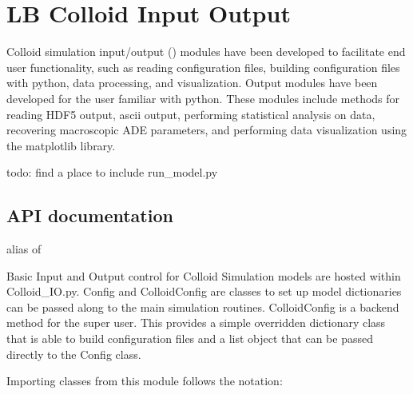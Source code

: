 \documentclass[letterpaper,10pt,english]{sphinxmanual}
\begin{document}
\section{LB Colloid Input Output}
\label{\detokenize{index:lb-colloid-input-output}}
Colloid simulation input/output () modules have been developed to facilitate end user functionality, such as reading configuration files, building configuration files with python, data processing, and visualization. Output modules have been developed for the user familiar with python. These modules include methods for reading HDF5 output, ascii output, performing statistical analysis on data, recovering macroscopic ADE parameters, and performing data visualization using the matplotlib library.

{\color{red}\bfseries{}\textbar{}}todo: find a place to include run\_model.py


\subsection{API documentation}
\label{\detokenize{index:id13}}\label{\detokenize{index:module-lb_colloids}}

\begin{fulllineitems}
\label{\detokenize{index:lb_colloids.cIO}}
alias of {\hyperref[\detokenize{index:module-lb_colloids.Colloids.Colloid_IO}]{}}

\end{fulllineitems}

\label{\detokenize{index:module-lb_colloids.Colloids.Colloid_IO}}
Basic Input and Output control for Colloid Simulation models are hosted within
Colloid\_IO.py. Config and ColloidConfig are classes to set up
model dictionaries can be passed along to the main simulation routines.
ColloidConfig is a backend method for the super user. This provides a simple overridden
dictionary class that is able to build configuration files and a list object that
can be passed directly to the Config class.

Importing classes from this module follows the notation:
\end{document}
